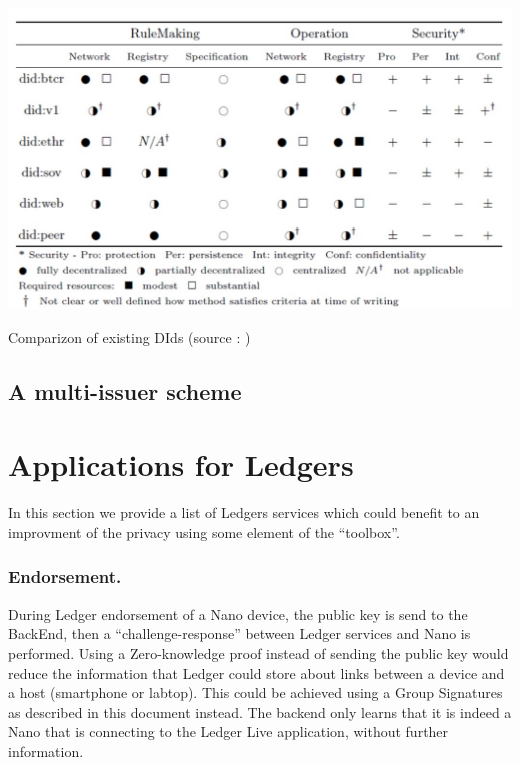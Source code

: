 \documentclass[11pt]{llncs2e/llncs}
\begin{document}
\begin{table}[h!]
\begin{center}
\includegraphics[width=14cm]{figs/Dids.jpg}
\caption{Comparizon of existing DIds (source : \cite{MGG18})} 
\end{center}
\end{table}

\subsection{A multi-issuer scheme}


\section{Applications for Ledgers}

In this section we provide a list of Ledgers services which could benefit to an improvment of the privacy using some element of the ``toolbox''.

\subsubsection{Endorsement.} During Ledger endorsement of a Nano device, the public key is send to the BackEnd, then a ``challenge-response'' between Ledger services and Nano is performed. Using a Zero-knowledge proof instead of sending the public key would reduce the information that Ledger could store about links between a device and a host (smartphone or labtop). This could be achieved using a Group Signatures as described in this document instead. The backend only learns that it is indeed a Nano that is connecting to the Ledger Live application, without further information.
\end{document}
